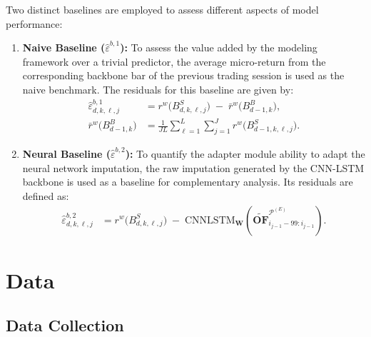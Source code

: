 \documentclass[10pt,a4paper,oneside]{article}
\providecommand{\DIFaddbegin}{} %
\providecommand{\DIFaddend}{} %
\newcommand{\DIFaddincludegraphics}[2][]{{\color{blue}\fbox{\DIFOincludegraphics[#1]{#2}}}} %
\DeclareRobustCommand{\DIFaddbegin}{\DIFOaddbegin \let\includegraphics\DIFaddincludegraphics} %
\DeclareRobustCommand{\DIFaddend}{\DIFOaddend \let\includegraphics\DIFOincludegraphics} %
\begin{document}
Two distinct baselines are employed to assess different aspects of model performance:

\begin{enumerate}
    \item \textbf{Naive Baseline ($\hat{\varepsilon}^{b,1}$):} To assess the value added by the modeling framework over a trivial predictor, the average micro-return from the corresponding backbone bar of the previous trading session is used as the naive benchmark. The residuals for this baseline are given by:
          \begin{align*}
              \hat{\varepsilon}^{b, 1}_{d,k,\ell,j} & = r^w\bigl(B^S_{d,k,\ell,j}\bigr) \;-\; \bar{r}^w\bigl(B^B_{d - 1, k}\bigr),         \\
              \bar{r}^w\bigl(B^B_{d - 1, k}\bigr)   & = \frac{1}{JL} \sum_{\ell = 1}^L \sum_{j = 1}^J r^w\bigl(B^S_{d - 1,k,\ell,j}\bigr).
          \end{align*}

    \item \textbf{Neural Baseline ($\hat{\varepsilon}^{b,2}$):} To quantify the adapter module ability to adapt the neural network imputation, the raw imputation generated by the CNN-LSTM backbone is used as a baseline for complementary analysis. Its residuals are defined as:
          \begin{align*}
              \hat{\varepsilon}^{b, 2}_{d,k,\ell,j} & = r^w\bigl(B^S_{d,k,\ell,j}\bigr) \;-\; \mathrm{CNNLSTM}_{\mathbf{W}}\!\left(\widetilde{\mathbf{OF}}^{\mathcal{P}^{(E)}}_{i_{j-1}-99:i_{j-1}}\right).
          \end{align*}
\end{enumerate}


\section{Data}
\DIFaddbegin \label{sec:data}
\DIFaddend 

\subsection{Data Collection}
\label{subsec:data_collection}
\end{document}
